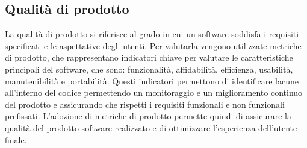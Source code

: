 \subsection{Qualità di prodotto}
\label{subsec:obiettivi_prodotto}
La qualità di prodotto si riferisce al grado in cui un software soddisfa i requisiti specificati e le aspettative degli utenti.
Per valutarla vengono utilizzate metriche di prodotto, che rappresentano indicatori chiave per valutare le caratteristiche principali del software, che sono:
funzionalità, affidabilità, efficienza, usabilità, manutenibilità e portabilità.
Questi indicatori permettono di identificare lacune all'interno del codice permettendo un monitoraggio e un miglioramento continuo del prodotto
e assicurando che rispetti i requisiti funzionali e non funzionali prefissati.
L'adozione di metriche di prodotto permette quindi di assicurare la qualità del prodotto software realizzato e di ottimizzare l'esperienza 
dell'utente finale.

\begin{table}[H]
    \centering
    \caption{Metriche di prodotto}
    \label{tab:metriche_prodotto} 
\end{table}

